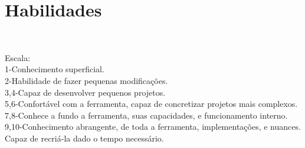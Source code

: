 \documentclass[A4]{deedy-resume} %
\newcommand\resume[2]{%
  \ifnum#1>#2
    $#1 > #2$
  \else
    \ifnum#1<0
      $#1 < 0$
    \else
      \ifnum#2<0
        $#2 < 0$
      \else
        \tikz{%
        \ifx#20
        \else
          \foreach \i in {1,...,#2} {
            \filldraw[black!20] (\i ex,0) circle (0.4ex);
          };
        \fi
        \ifx#10
        \else
          \foreach \i in {1,...,#1} {
            \filldraw[black] (\i ex,0) circle (0.4ex);
          };
        \fi
        }
      \fi
    \fi
  \fi
}
\begin{document}
\begin{minipage}[t]{0.33\textwidth}
\section{Habilidades}


\\

\vspace*{0.2cm}

\vspace*{0.2cm}


\vspace*{0.5cm}
Escala:\\
\scriptsize 1-Conhecimento superficial.\\
2-Habilidade de fazer pequenas modificações.\\
3,4-Capaz de desenvolver pequenos projetos.\\
5,6-Confortável com a ferramenta, capaz de concretizar projetos mais complexos.\\
7,8-Conhece a fundo a ferramenta, suas capacidades, e funcionamento interno. \\
9,10-Conhecimento abrangente, de toda a ferramenta, implementações, e nuances. Capaz de recriá-la dado o tempo necessário.


\end{minipage}
\end{document}
